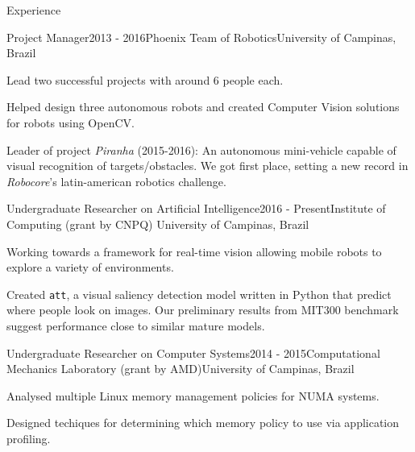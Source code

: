 \documentclass[8pt]{resume}
\newcommand{\tit}[1]{\textit{#1}}
\newcommand{\ttt}[1]{\texttt{#1}}
\begin{document}
\begin{rSection}{Experience}

\begin{rSubsection}{Project Manager}{2013 - 2016}{Phoenix Team of Robotics}{University of Campinas, Brazil}
    \item Lead two successful projects with around 6 people each.
    \item Helped design three autonomous robots and
        created Computer Vision solutions for robots using OpenCV.
    \item Leader of project \tit{Piranha} (2015-2016):
        An autonomous mini-vehicle capable of visual recognition of
        targets/obstacles.
        We got first place, setting a new record in \tit{Robocore}'s
        latin-american
        robotics challenge.
\end{rSubsection}

\begin{rSubsection}{Undergraduate Researcher on Artificial Intelligence}{2016 - Present}{Institute of Computing (grant by CNPQ)}
    {University of Campinas, Brazil}
    \item Working towards a framework for real-time vision
        allowing mobile robots to explore a variety of environments.
    \item Created \ttt{att}, a visual saliency detection model written in
        Python that predict where people look on images.
        Our preliminary results from MIT300 benchmark suggest performance
        close to similar mature models.
\end{rSubsection}

\begin{rSubsection}{Undergraduate Researcher on Computer Systems}{2014 - 2015}{Computational Mechanics Laboratory (grant by AMD)}{University of Campinas, Brazil}
    \item Analysed multiple Linux memory management policies for NUMA systems.
    \item Designed techiques for determining which memory policy
        to use via application profiling.
\end{rSubsection}


\end{rSection}
\end{document}
